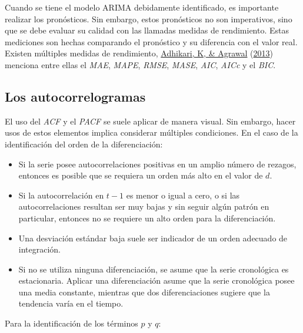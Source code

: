 \documentclass[
]{article}
\providecommand{\tightlist}{%
  \setlength{\itemsep}{0pt}\setlength{\parskip}{0pt}}
\begin{document}
Cuando se tiene el modelo ARIMA debidamente identificado, es importante
realizar los pronósticos. Sin embargo, estos pronósticos no son
imperativos, sino que se debe evaluar su calidad con las llamadas
medidas de rendimiento. Estas mediciones son hechas comparando el
pronóstico y su diferencia con el valor real. Existen múltiples medidas
de rendimiento, \protect\hyperlink{ref-medidas}{Adhikari, K, \& Agrawal}
(\protect\hyperlink{ref-medidas}{2013}) menciona entre ellas el
\emph{MAE}, \emph{MAPE}, \emph{RMSE}, \emph{MASE}, \emph{AIC},
\emph{AICc} y el \emph{BIC}.

\subsection{Los autocorrelogramas}

El uso del \emph{ACF} y el \emph{PACF} se suele aplicar de manera
visual. Sin embargo, hacer usos de estos elementos implica considerar
múltiples condiciones. En el caso de la identificación del orden de la
diferenciación:

\begin{itemize}
\tightlist
\item
  Si la serie posee autocorrelaciones positivas en un amplio número de
  rezagos, entonces es posible que se requiera un orden más alto en el
  valor de \(d\).
\item
  Si la autocorrelación en \(t-1\) es menor o igual a cero, o si las
  autocorrelaciones resultan ser muy bajas y sin seguir algún patrón en
  particular, entonces no se requiere un alto orden para la
  diferenciación.
\item
  Una desviación estándar baja suele ser indicador de un orden adecuado
  de integración.
\item
  Si no se utiliza ninguna diferenciación, se asume que la serie
  cronológica es estacionaria. Aplicar una diferenciación asume que la
  serie cronológica posee una media constante, mientras que dos
  diferenciaciones sugiere que la tendencia varía en el tiempo.
\end{itemize}

Para la identificación de los términos \(p\) y \(q\):
\end{document}
